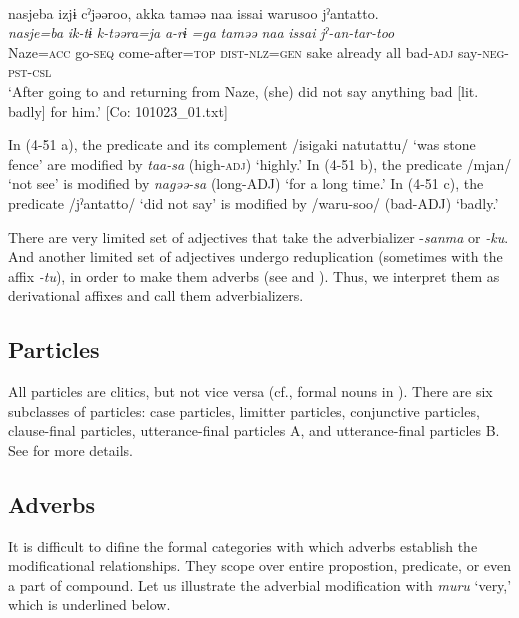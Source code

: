 \ex{}\\ 
     \glll  nasjeba  izjɨ  cˀjəəroo,  akka  taməə   naa  issai  warusoo  jˀantatto.\\
      \textit{nasje=ba}  \textit{ik-tɨ}  \textit{k-təəra=ja}  \textit{a-rɨ} \textit{=ga}  \textit{taməə}  \textit{naa}  \textit{issai}  \textit{}  \textit{jˀ-an-tar-too}\\
      Naze=\textsc{acc}  go-\textsc{seq}  come-after=\textsc{top}  \textsc{dist}-\textsc{nlz}=\textsc{gen}  sake                                                already  all  bad-\textsc{adj}  say-\textsc{neg}-\textsc{pst}-\textsc{csl}\\
      \glt ‘After going to and returning from Naze, (she) did not say anything bad [lit. badly] for him.’    [Co: 101023\_01.txt]
    \z
\z

In (4-51 a), the predicate and its complement /isigaki natutattu/ ‘was stone fence’ are modified by \textit{taa-sa} (high-\textsc{adj}) ‘highly.’ In (4-51 b), the predicate /mjan/ ‘not see’ is modified by \textit{nagəə-sa} (long-ADJ) ‘for a long time.’ In (4-51 c), the predicate /jˀantatto/ ‘did not say’ is modified by /waru-soo/ (bad-ADJ) ‘badly.’

There are very limited set of adjectives that take the adverbializer -\textit{sanma} or \textit{{}-ku}. And another limited set of adjectives undergo reduplication (sometimes with the affix \textit{{}-tu}), in order to make them adverbs (see  and ). Thus, we interpret them as derivational affixes and call them adverbializers.

\subsection{Particles}\label{sec:4.3.5}

All particles are clitics, but not vice versa (cf., formal nouns in ). There are six subclasses of particles: case particles, limitter particles, conjunctive particles, clause-final particles, utterance-final particles A, and utterance-final particles B. See  for more details.

\subsection{Adverbs}\label{sec:4.3.6}

It is difficult to difine the formal categories with which adverbs establish the modificational relationships. They scope over entire propostion, predicate, or even a part of compound. Let us illustrate the adverbial modification with \textit{muru} ‘very,’ which is underlined below.

